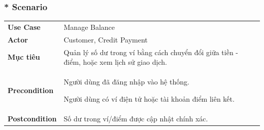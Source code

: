 \documentclass{article}
\begin{document}
\subsubsection*{* Scenario}
\begin{table}[h!]
\centering
\begin{tabular}{p{3cm} p{11cm}}
\hline
\vspace{0.025cm}
\textbf{Use Case} & \vspace{0.025cm} Manage Balance \\
\textbf{Actor} & Customer, Credit Payment \\
\textbf{Mục tiêu} & Quản lý số dư trong ví bằng cách chuyển đổi giữa tiền - điểm, hoặc xem lịch sử giao dịch. \\
\textbf{Precondition} & 
    Người dùng đã đăng nhập vào hệ thống.

    Người dùng có ví điện tử hoặc tài khoản điểm liên kết. \\
\textbf{Postcondition} & 
    Số dư trong ví/điểm được cập nhật chính xác.


\end{tabular}
\end{table}
\end{document}
